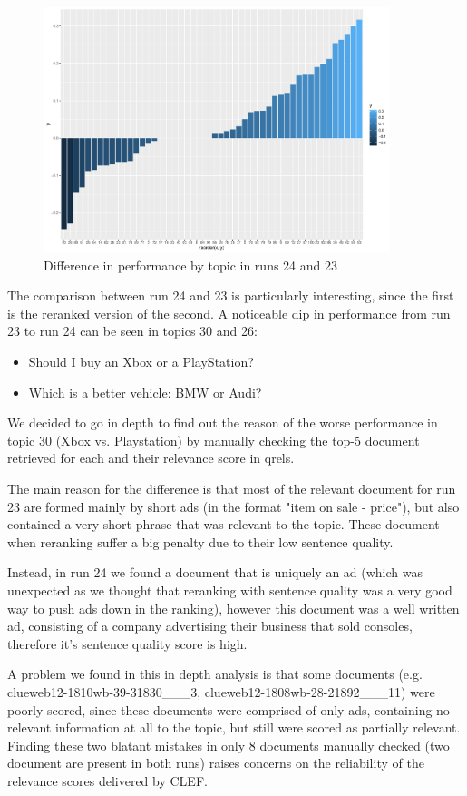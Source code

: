\begin{figure}[h]
	\centering
	\includegraphics[width=0.9\textwidth]{figure/rundiff24-23.pdf}
	\caption{Difference in performance by topic in runs 24 and 23}
	\label{fig:diff24-23}
\end{figure}

The comparison between run 24 and 23 is particularly interesting, since the first is the reranked version of the second. A noticeable dip in performance from run 23 to run 24 can be seen in topics 30 and 26:
\begin{itemize}
	\item Should I buy an Xbox or a PlayStation?
	\item Which is a better vehicle: BMW or Audi?
\end{itemize}
We decided to go in depth to find out the reason of the worse performance in topic 30 (Xbox vs. Playstation) by manually checking the top-5 document retrieved for each and their relevance score in qrels.

The main reason for the difference is that most of the relevant document for run 23 are formed mainly by short ads (in the format "item on sale - price"), but also contained a very short phrase that was relevant to the topic. These document when reranking suffer a big penalty due to their low sentence quality.

Instead, in run 24 we found a document that is uniquely an ad (which was unexpected as we thought that reranking with sentence quality was a very good way to push ads down in the ranking), however this document was a well written ad, consisting of a company advertising their business that sold consoles, therefore it's sentence quality score is high.

A problem we found in this in depth analysis is that some documents (e.g. clueweb12-1810wb-39-31830\_\_\_3, clueweb12-1808wb-28-21892\_\_\_11) were poorly scored, since these documents were comprised of only ads, containing no relevant information at all to the topic, but still were scored as partially relevant.
Finding these two blatant mistakes in only 8 documents manually checked (two document are present in both runs) raises concerns on the reliability of the relevance scores delivered by CLEF.